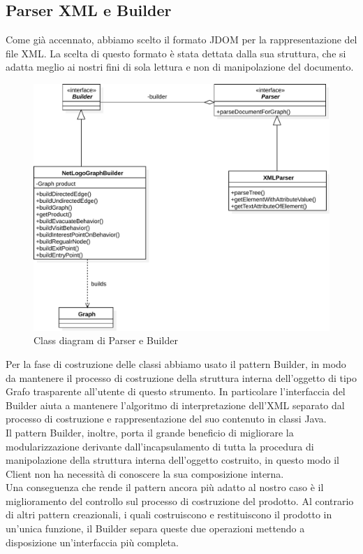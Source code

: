\subsection{Parser XML e Builder}
Come già accennato, abbiamo scelto il formato JDOM per la rappresentazione del file XML. La scelta di questo formato è stata dettata dalla sua struttura, che si adatta meglio ai nostri fini di sola lettura e non di manipolazione del documento.\\
\begin{figure}[htbp]
\centering
\includegraphics[width=\textwidth,height=\textheight,keepaspectratio]{images/builder-diagram.pdf}
\caption{Class diagram di Parser e Builder}
\label{fig:builder-diagram}
\end{figure}
Per la fase di costruzione delle classi abbiamo usato il pattern Builder, in modo da mantenere il processo di costruzione della struttura interna dell'oggetto di tipo Grafo trasparente all'utente di questo strumento. In particolare l'interfaccia del Builder aiuta a mantenere l'algoritmo di interpretazione dell'XML separato dal processo di costruzione e rappresentazione del suo contenuto in classi Java.\\
Il pattern Builder, inoltre, porta il grande beneficio di migliorare la modularizzazione derivante dall'incapsulamento di tutta la procedura di manipolazione della struttura interna dell'oggetto costruito, in questo modo il Client non ha necessità di conoscere la sua composizione interna.\\
Una conseguenza che rende il pattern ancora più adatto al nostro caso è il miglioramento del controllo sul processo di costruzione del prodotto. Al contrario di altri pattern creazionali, i quali costruiscono e restituiscono il prodotto in un'unica funzione, il Builder separa queste due operazioni mettendo a disposizione un'interfaccia più completa.\\
